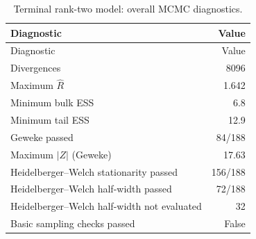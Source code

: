 \documentclass[pdftex,12pt,openright,a4paper,oneside]{book}
\begin{document}
\begin{longtable}{@{}p{}r@{}}

\caption{Terminal rank-two model: overall MCMC diagnostics.}\label{tab:terminal_rank2_diagnostics}\\

\toprule

Diagnostic & Value \\

\midrule\endfirsthead

\toprule

Diagnostic & Value \\

\midrule\endhead

Divergences & 8096 \\

Maximum $\widehat R$ & 1.642 \\

Minimum bulk ESS & 6.8 \\

Minimum tail ESS & 12.9 \\

Geweke passed & 84/188 \\

Maximum $|Z|$ (Geweke) & 17.63 \\

Heidelberger--Welch stationarity passed & 156/188 \\

Heidelberger--Welch half-width passed & 72/188 \\

Heidelberger--Welch half-width not evaluated & 32 \\

Basic sampling checks passed & False \\

\bottomrule\end{longtable}
\end{document}
